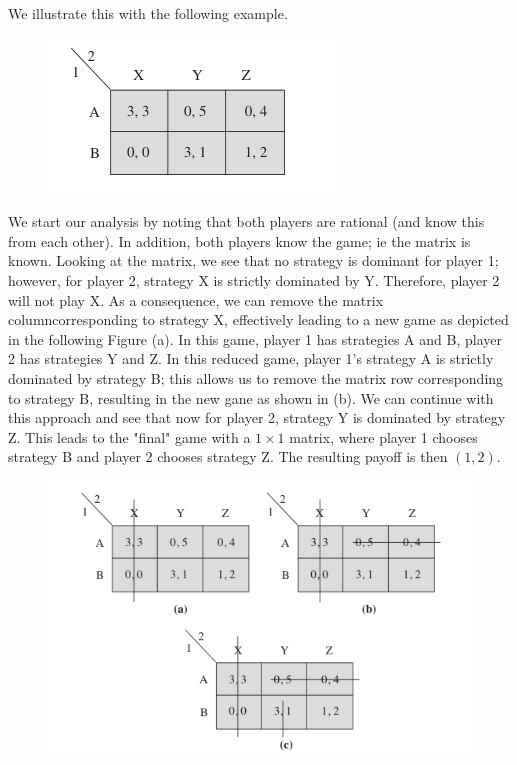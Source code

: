 We illustrate this with the following example.

\begin{figure}[H]
    \centering
    \includegraphics[scale=0.7]{images/2023-11-21-game_theory_03.png}
\end{figure}


We start our analysis by noting that both players are rational (and know this from each other). In addition, both players know the game; ie the matrix is known. Looking at the matrix, we see that no strategy is dominant for player 1; however, for player 2, strategy X is strictly dominated by Y. Therefore, player 2 will not play X. As a consequence, we can remove the matrix columncorresponding to strategy X, effectively leading to a new game as depicted in the following Figure (a). In this game, player 1 has strategies A and B, player 2 has strategies Y and Z. In this reduced game, player 1's strategy A is strictly dominated by strategy B; this allows us to remove the matrix row corresponding to strategy B, resulting in the new gane as shown in (b). We can continue with this approach and see that now for player 2, strategy Y is dominated by strategy Z. This leads to the "final" game with a $1 \times 1 $ matrix, where player 1 chooses strategy B and player 2 chooses strategy Z. The resulting payoff is then $(1,2)$.

\begin{figure}[H]
    \centering
    \includegraphics[scale=0.7]{images/2023-11-21-game_theory_04.png}
\end{figure}

